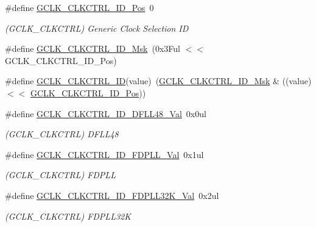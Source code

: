 \begin{DoxyCompactItemize}
\#define \mbox{\hyperlink{group___s_a_m_d21___g_c_l_k_ga882860b306b819b8bb342bebd55c23aa}{G\+C\+L\+K\+\_\+\+C\+L\+K\+C\+T\+R\+L\+\_\+\+I\+D\+\_\+\+Pos}}~0
\begin{DoxyCompactList}\small\item\em (G\+C\+L\+K\+\_\+\+C\+L\+K\+C\+T\+RL) Generic Clock Selection ID \end{DoxyCompactList}\item 
\#define \mbox{\hyperlink{group___s_a_m_d21___g_c_l_k_gacfb6324cf6ce3d532d189e935af7eab1}{G\+C\+L\+K\+\_\+\+C\+L\+K\+C\+T\+R\+L\+\_\+\+I\+D\+\_\+\+Msk}}~(0x3\+Ful $<$$<$ G\+C\+L\+K\+\_\+\+C\+L\+K\+C\+T\+R\+L\+\_\+\+I\+D\+\_\+\+Pos)
\item 
\#define \mbox{\hyperlink{group___s_a_m_d21___g_c_l_k_ga6ca62f336958b605840843748ae83806}{G\+C\+L\+K\+\_\+\+C\+L\+K\+C\+T\+R\+L\+\_\+\+ID}}(value)~(\mbox{\hyperlink{group___s_a_m_d21___g_c_l_k_gacfb6324cf6ce3d532d189e935af7eab1}{G\+C\+L\+K\+\_\+\+C\+L\+K\+C\+T\+R\+L\+\_\+\+I\+D\+\_\+\+Msk}} \& ((value) $<$$<$ \mbox{\hyperlink{group___s_a_m_d21___g_c_l_k_ga882860b306b819b8bb342bebd55c23aa}{G\+C\+L\+K\+\_\+\+C\+L\+K\+C\+T\+R\+L\+\_\+\+I\+D\+\_\+\+Pos}}))
\item 
\#define \mbox{\hyperlink{group___s_a_m_d21___g_c_l_k_gab1b72b8b751c1bd1d0994d731a79ee82}{G\+C\+L\+K\+\_\+\+C\+L\+K\+C\+T\+R\+L\+\_\+\+I\+D\+\_\+\+D\+F\+L\+L48\+\_\+\+Val}}~0x0ul
\begin{DoxyCompactList}\small\item\em (G\+C\+L\+K\+\_\+\+C\+L\+K\+C\+T\+RL) D\+F\+L\+L48 \end{DoxyCompactList}\item 
\#define \mbox{\hyperlink{group___s_a_m_d21___g_c_l_k_ga63b5e4e7d95cdf03dda642e327ed47f5}{G\+C\+L\+K\+\_\+\+C\+L\+K\+C\+T\+R\+L\+\_\+\+I\+D\+\_\+\+F\+D\+P\+L\+L\+\_\+\+Val}}~0x1ul
\begin{DoxyCompactList}\small\item\em (G\+C\+L\+K\+\_\+\+C\+L\+K\+C\+T\+RL) F\+D\+P\+LL \end{DoxyCompactList}\item 
\#define \mbox{\hyperlink{group___s_a_m_d21___g_c_l_k_gab8b800b562675cc84f402818aebcd947}{G\+C\+L\+K\+\_\+\+C\+L\+K\+C\+T\+R\+L\+\_\+\+I\+D\+\_\+\+F\+D\+P\+L\+L32\+K\+\_\+\+Val}}~0x2ul
\begin{DoxyCompactList}\small\item\em (G\+C\+L\+K\+\_\+\+C\+L\+K\+C\+T\+RL) F\+D\+P\+L\+L32K \end{DoxyCompactList}\item 

\end{DoxyCompactItemize}
